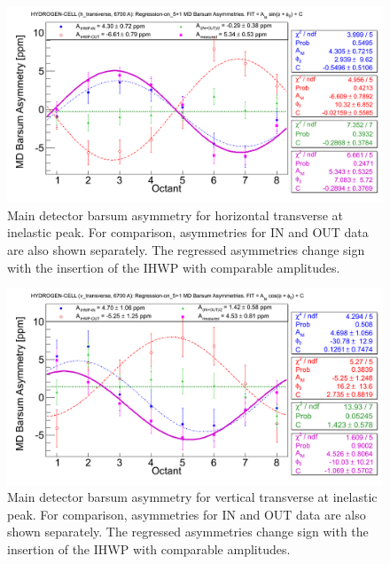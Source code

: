 
\begin{singlespace}
\begin{figure}[!h]
	\begin{center}
	\includegraphics[width=15.0cm]{figures/BarsumAsym_on_5+1_h-LH2}
	\end{center}
	\caption
	{Main detector barsum asymmetry for horizontal transverse at inelastic peak. For comparison, asymmetries for IN and OUT data are also shown separately. The regressed asymmetries change sign with the insertion of the IHWP with comparable amplitudes. }
	\label{fig:BarsumAsym_on_5+1_h-LH2}
\end{figure}
\end{singlespace}

\begin{singlespace}
\begin{figure}[!h]
	\begin{center}
	\includegraphics[width=15.0cm]{figures/BarsumAsym_on_5+1_v-LH2}
	\end{center}
	\caption
	{Main detector barsum asymmetry for vertical transverse at inelastic peak. For comparison, asymmetries for IN and OUT data are also shown separately. The regressed asymmetries change sign with the insertion of the IHWP with comparable amplitudes.}
	\label{fig:BarsumAsym_on_5+1_v-LH2}
\end{figure}
\end{singlespace}

